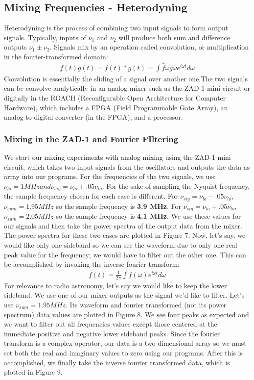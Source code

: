 \documentclass[12pt]{article}
\begin{document}
\subsection{Mixing Frequencies - Heterodyning}
Heterodyning is the process of combining two input signals to form
output signals. Typically, inputs of $\nu_{1}$ and $\nu_{2}$ will
produce both sum and difference outputs $\nu_{1} \pm \nu_{2}$. Signals
mix by an operation called convolution, or multiplication in the
fourier-transformed domain:
\begin{align}f(t)g(t) = f(t)\ast{g(t)} = \int
  \hat{f}{\omega}\hat{g}{\omega}e^{i\omega{t}}d\omega \end{align} 
Convolution is essentially the sliding of a signal over another one.The
two signals can be convolve analytically in an analog mixer such as
the ZAD-1 mini circuit or digitally in the ROACH (Reconfigurable Open
Architecture for Computer Hardware), which includes a FPGA (Field 
Programmable Gate Array), an analog-to-digital converter (in the FPGA), 
and a processor. 
\subsubsection{Mixing in the ZAD-1 and Fourier FIltering}
We start our mixing experiments with analog mixing using the ZAD-1 mini
circuit, which takes two input signals from the oscillators and 
outputs the data as array into our programs. For the frequencies of the
two signals, we use $\nu_{lo} = 1 MHz and \nu_{sig} = \nu_{lo} \pm
.05\nu_{lo}$. For the sake of sampling the Nyquist frequency, the sample
frequency chosen for each case is different. For $\nu_{sig} = \nu_{lo} -
.05\nu_{lo}$, $\nu_{sum} = 1.95 MHz$ so the sample frequency is \textbf{3.9
MHz}. For $\nu_{sig} = \nu_{lo} + .05\nu_{lo}$, $\nu_{sum} = 2.05 MHz$ so
the sample frequency is \textbf{4.1 MHz}. We use these values for our signals and
then take the power spectra of the output data from the
mixer. The power spectra for these two cases are plotted in Figure
7. Now, let's say, we would like
only one sideband so we can see the waveform due to only one real peak
value for the frequency; we would have to filter out the other one. This
can be accomplished by invoking the inverse fourier transform:
\begin{align}f(t) = \frac{1}{2\pi}\int f(\omega) e^{i\omega{t}} d\omega\end{align}
For relevance to radio astronomy, let's say we would like to keep the lower
sideband. We use one of our mixer outputs as the signal we'd like to
filter. Let's use $\nu_{sum} = 1.95 MHz$. Its waveform and fourier
transformed (not its power spectrum) data values  are plotted in Figure
8. We see four peaks as expected and we want to filter out all
frequencies values except those centered at the immediate positive and
negative lower sideband peaks. Since the fourier transform is a complex
operator, our data is a two-dimensional array so we must set both the
real and imaginary values to zero using our programs. After this is 
accomplished, we finally take the inverse fourier transformed data, 
which is plotted in Figure 9.
\end{document}
